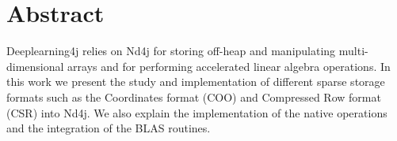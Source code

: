 

\cleardoublepage
\chapter*{Abstract}

Deeplearning4j relies on Nd4j for storing off-heap and manipulating multi-dimensional arrays and for performing accelerated linear algebra operations. In this work we present the study and implementation of different sparse storage formats such as the Coordinates format (COO) and Compressed Row format (CSR) into Nd4j. We also explain the implementation of the native operations and the integration of the BLAS routines.


\vskip0.5cm




